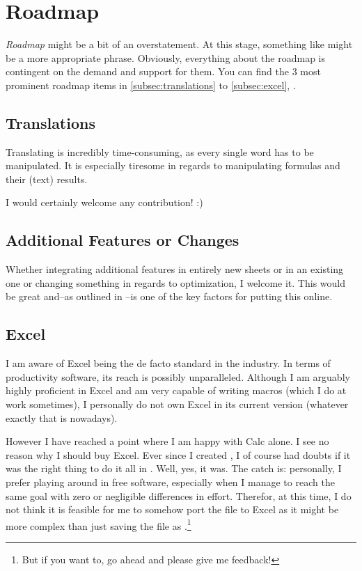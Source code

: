 \section{Roadmap}
\label{sec:roadmap}

\emph{Roadmap} might be a bit of an overstatement.
At this stage, something like  might be a more appropriate phrase.
Obviously, everything about the roadmap is contingent on the demand and support for them.
You can find the 3 most prominent roadmap items in \autoref{subsec:translations} to \autoref{subsec:excel}, .

\subsection{Translations}
\label{subsec:translations}

Translating \tfn is incredibly time-consuming, as every single word has to be manipulated.
It is especially tiresome in regards to manipulating formulas and their (text) results.

I would certainly welcome any contribution! :)

\subsection{Additional Features or Changes}
\label{subsec:additional-features}

Whether integrating additional features in entirely new sheets or in an existing one or changing something in regards to optimization, I welcome it.
This would be great and--as outlined in --is one of the key factors for putting this online.

\subsection{Excel}
\label{subsec:excel}

I am aware of Excel being the de facto standard in the industry.
In terms of productivity software, its reach is possibly unparalleled.
Although I am arguably highly proficient in Excel and am very capable of writing macros (which I do at work sometimes), I personally do not own Excel in its current version (whatever exactly that is nowadays).

However I have reached a point where I am happy with Calc alone.
I see no reason why I should buy Excel.
Ever since I created \tfn, I of course had doubts if it was the right thing to do it all in \loc.
Well, yes, it was.
The catch is: personally, I prefer playing around in free software, especially when I manage to reach the same goal with zero or negligible differences in effort.
Therefor, at this time, I do not think it is feasible for me to somehow port the file to Excel as it might be more complex than just saving the file as .\footnote{But if you want to, go ahead and please give me feedback!}


